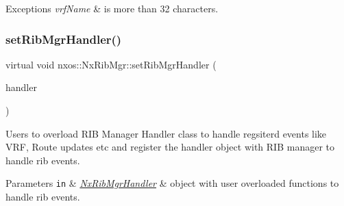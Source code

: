 \begin{DoxyExceptions}{Exceptions}
{\em vrf\+Name} & is more than 32 characters. \\
\hline
\end{DoxyExceptions}
\mbox{\label{classnxos_1_1_nx_rib_mgr_ac42dd29e34f9c508614733dbec518b99}} 
\subsubsection{\texorpdfstring{set\+Rib\+Mgr\+Handler()}{setRibMgrHandler()}}
{\footnotesize\ttfamily virtual void nxos\+::\+Nx\+Rib\+Mgr\+::set\+Rib\+Mgr\+Handler (\begin{DoxyParamCaption}\item[{\mbox{\hyperlink{classnxos_1_1_nx_rib_mgr_handler}{Nx\+Rib\+Mgr\+Handler}} $\ast$}]{handler }\end{DoxyParamCaption})\hspace{0.3cm}{\ttfamily [pure virtual]}}

Users to overload R\+IB Manager Handler class to handle regsiterd events like V\+RF, Route updates etc and register the handler object with R\+IB manager to handle rib events. 
\begin{DoxyParams}[1]{Parameters}
\mbox{\tt in}  & {\em \mbox{\hyperlink{classnxos_1_1_nx_rib_mgr_handler}{Nx\+Rib\+Mgr\+Handler}}} & object with user overloaded functions to handle rib events.\\
\hline
\end{DoxyParams}

